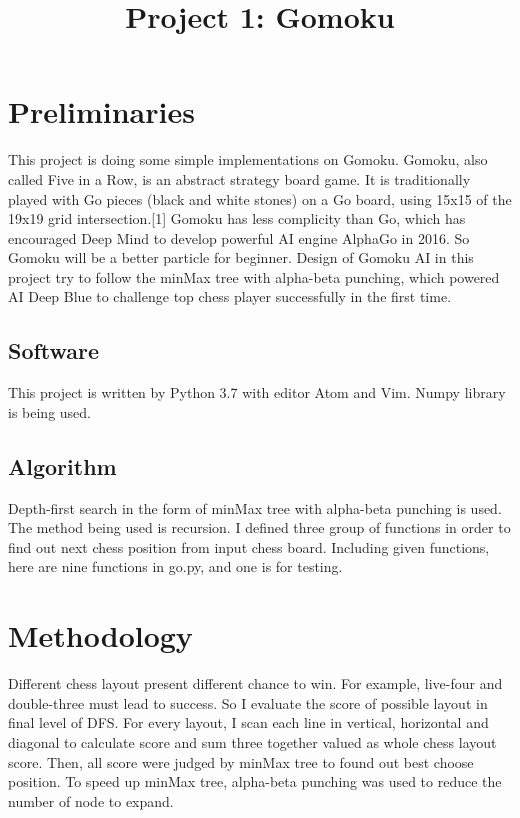\documentclass[conference,compsoc]{IEEEtran}
\begin{document}
\title{Project 1: Gomoku}

\author{
}

\maketitle


\IEEEpeerreviewmaketitle

\section{Preliminaries}
This project is doing some simple implementations on Gomoku. Gomoku, also called 
Five in a Row, is an abstract strategy board game. It is traditionally played 
with Go pieces (black and white stones) on a Go board, using 15x15 of the 19x19
grid intersection.[1] Gomoku has less complicity than Go, which has encouraged
Deep Mind to develop powerful AI engine AlphaGo in 2016. So Gomoku will be a
better particle for beginner. Design of Gomoku AI in this project try to
follow the minMax tree with alpha-beta punching, which powered AI Deep Blue to
challenge top chess player successfully in the first time.

\subsection{Software}
This project is written by Python 3.7 with editor Atom and Vim. Numpy library
is being used.


\subsection{Algorithm}
Depth-first search in the form of minMax tree with alpha-beta punching is used.
The method being used is recursion. I defined three group of functions in order
to find out next chess position from input chess board. Including given
functions, here are nine functions in go.py, and one is for testing.


\section{Methodology}
Different chess layout present different chance to win. For example, live-four
and double-three must lead to success. So I evaluate the score of possible
layout in final level of DFS. For every layout, I scan each line in vertical,
horizontal and diagonal to calculate score and sum three together valued as
whole chess layout score. Then, all score were judged by minMax tree to found
out best choose position. To speed up minMax tree, alpha-beta punching was used
to reduce the number of node to expand.
\end{document}
